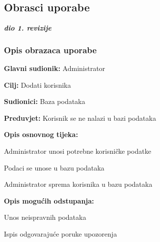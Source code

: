 			\eject 
			
			
				
			\subsection{Obrasci uporabe}
				
				\textbf{\textit{dio 1. revizije}}
				
				\subsubsection{Opis obrazaca uporabe}
				
					\noindent {}
					\begin{packed_item}
						
						\item \textbf{Glavni sudionik: }Administrator
						\item  \textbf{Cilj:} Dodati korisnika
						\item  \textbf{Sudionici:} Baza podataka
						\item  \textbf{Preduvjet:} Korisnik se ne nalazi u bazi podataka
						\item  \textbf{Opis osnovnog tijeka:}
						
						\item[] \begin{packed_enum}
							
							\item Administrator unosi potrebne korisničke podatke
							\item Podaci se unose u bazu podataka
							\item Administrator sprema korisnika u bazu podataka
							
						\end{packed_enum}
						
						\item  \textbf{Opis mogućih odstupanja:}
						
						\item[] \begin{packed_item}
							
							\item[1.a] Unos neispravnih podataka
							\item[] \begin{packed_enum}
								
								\item Ispis odgovarajuće poruke upozorenja
								
								
							\end{packed_enum}
							
							
						\end{packed_item}
					\end{packed_item}
				
